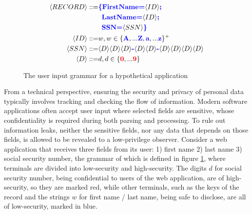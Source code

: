 \begin{figure}[tbp]
  \small
  \begin{align*}
    \langle RECORD \rangle ::= & {\color{blue} \textbf{\{FirstName=}} \langle ID \rangle {\color{blue} \textbf{;}} \\
                               & \enspace {\color{blue} \textbf{LastName=}} \langle ID \rangle {\color{blue} \textbf{;}} \\
                               & \enspace {\color{blue} \textbf{SSN=}} \langle SSN \rangle {\color{blue} \textbf{\}}} \\
    \langle ID \rangle     ::= & w , w \in \{ {\color{blue} \textbf{A}}, ... {\color{blue} \textbf{Z}}, {\color{blue} \textbf{a}}, ... {\color{blue} \textbf{z}} \}^{+} \\
    \langle SSN \rangle    ::= & \langle D \rangle \langle D \rangle \langle D \rangle {\color{blue} \textbf{-}}
                                 \langle D \rangle \langle D \rangle {\color{blue} \textbf{-}}
                                 \langle D \rangle \langle D \rangle \langle D \rangle \langle D \rangle \\
    \langle D \rangle      ::= & d , d \in \{ {\color{red} \textbf{0}}, ... {\color{red} \textbf{9}} \}
  \end{align*}
  \caption{The user input grammar for a hypothetical application}
  \label{fig:grammar}
\end{figure}

From a technical perspective, ensuring the security and privacy of
personal data typically involves tracking and checking
the flow of information.
Modern software applications often accept user input where
selected fields are sensitive, whose confidentiality is required
during both parsing and processing. To rule out information leaks,
neither the sensitive fields, nor any data that depends on those fields,
is allowed to be revealed to a low-privilege observer.
Consider a web application that receives three fields from its user:
1) first name 2) last name 3) social security number, the grammar of which
is defined in figure \ref{fig:grammar}, where terminals are divided into
low-security and high-security.
The digits $d$ for social security number, being confidential to users of
the web application, are of high-security, so they are marked {\color{red}
  red}, while other terminals, such as the keys of the record and the
strings $w$ for first name / last name, being safe to disclose, are
all of low-security, marked in {\color{blue} blue}.

